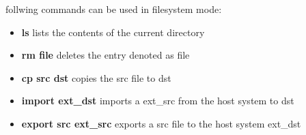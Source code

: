 follwing commands can be used in filesystem mode:

\begin{itemize}
  \item {\textbf{ls}} lists the contents of the current directory
  \item {\textbf{rm file}} deletes the entry denoted as file
  \item {\textbf{cp src dst}} copies the src file to dst 
  \item {\textbf{import ext\_dst}} imports a ext\_src from the host system to
  dst
  \item {\textbf{export src ext\_src}} exports a src file to the host system
  ext\_dst
\end{itemize}

